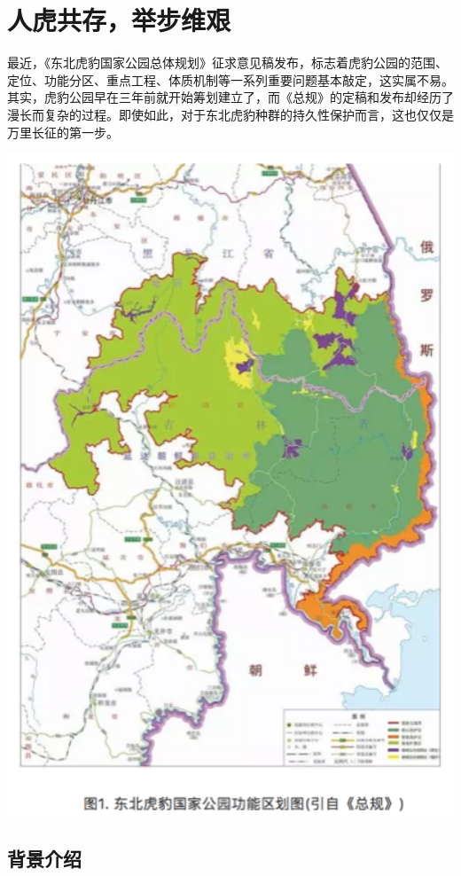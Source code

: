 \documentclass[]{book}
\begin{document}
\section{人虎共存，举步维艰}

最近，《东北虎豹国家公园总体规划》征求意见稿发布，标志着虎豹公园的范围、定位、功能分区、重点工程、体质机制等一系列重要问题基本敲定，这实属不易。其实，虎豹公园早在三年前就开始筹划建立了，而《总规》的定稿和发布却经历了漫长而复杂的过程。即使如此，对于东北虎豹种群的持久性保护而言，这也仅仅是万里长征的第一步。

\includegraphics[width=5.62in]{images/tiger1}

\subsection{背景介绍}
\end{document}
